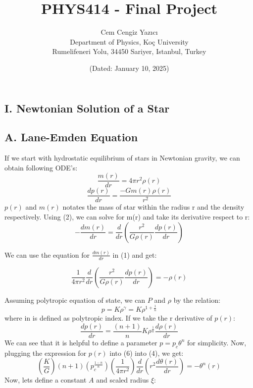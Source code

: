\documentclass{article}
\title{PHYS414 - Final Project}
\author{
    Cem Cengiz Yazıcı \\
    Department of Physics, Koç University \\
    Rumelifeneri Yolu, 34450 Sariyer, Istanbul, Turkey
}
\date{(Dated: January 10, 2025)}
\begin{document}
\maketitle

\begin{center}
    \section*{I. Newtonian Solution of a Star}
\end{center}

\subsection*{A. Lane-Emden Equation}
If we start with hydrostatic equilibrium of stars in Newtonian gravity, we can obtain following ODE's:
\begin{equation}
    \frac{m(r)}{dr} = 4\pi r^2\rho(r) 
\end{equation}
\begin{equation}
    \frac{dp(r)}{dr} = \frac{-Gm(r)\rho (r)}{r^2}
\end{equation}
$p(r)$ and $m(r)$ notates the mass of star within the radius r and the density respectively. Using (2), we can solve for m(r) and take its derivative respect to r:
\begin{equation}
    -\frac{dm(r)}{dr} = \frac{d}{dr}(\frac{r^2}{G\rho(r)}\frac{dp(r)}{dr}) 
\end{equation}

We can use the equation for $\displaystyle\frac{dm(r)}{dr}$ in (1) and get:

\begin{equation}
    \frac{1}{4\pi r^2}\frac{d}{dr}(\frac{r^2}{G\rho(r)}\frac{dp(r)}{dr}) = -\rho(r)
\end{equation}

Assuming polytropic equation of state, we can $P$ and $\rho$ by the relation:
\begin{equation}
    p = K\rho ^\gamma = K\rho ^{1+\frac{1}{n}}
\end{equation}
where in is defined as polytropic index. If we take the r derivative of $p(r)$:
\begin{equation}
    \frac{dp(r)}{dr} = \frac{(n+1)}{n}K\rho^{\frac{1}{n}}\frac{d\rho(r)}{dr}
\end{equation}
We can see that it is helpful to define a parameter $p = p_c\theta^n$ for simplicity. Now, plugging the expression for $p(r)$ into (6) into (4), we get:
\begin{equation}
    (\frac{K}{G})(n+1)(p_c^{\frac{1-n}{n}})(\frac{1}{4\pi r^2})\frac{d}{dr}(r^2\frac{d\theta(r)}{dr}) = -\theta^n(r)
\end{equation}
Now, lets define a constant $A$ and scaled radius $\xi$:
\end{document}
